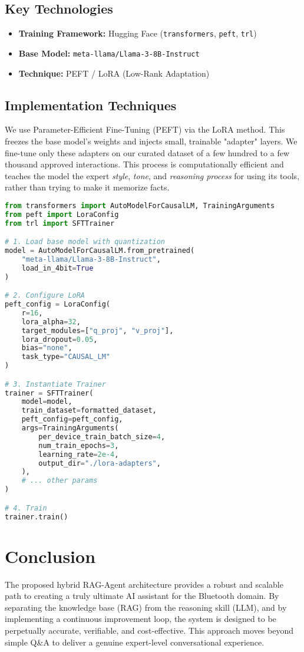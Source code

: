 \documentclass[11pt, a4paper]{article}
\begin{document}
\subsection{Key Technologies}
\begin{itemize}
    \item \textbf{Training Framework:} Hugging Face (\texttt{transformers}, \texttt{peft}, \texttt{trl})
    \item \textbf{Base Model:} \texttt{meta-llama/Llama-3-8B-Instruct}
    \item \textbf{Technique:} PEFT / LoRA (Low-Rank Adaptation)
\end{itemize}

\subsection{Implementation Techniques}
We use Parameter-Efficient Fine-Tuning (PEFT) via the LoRA method. This freezes the base model's weights and injects small, trainable "adapter" layers. We fine-tune only these adapters on our curated dataset of a few hundred to a few thousand approved interactions. This process is computationally efficient and teaches the model the expert \textit{style}, \textit{tone}, and \textit{reasoning process} for using its tools, rather than trying to make it memorize facts.

\begin{lstlisting}[language=Python, caption=Conceptual Fine-Tuning Script]
from transformers import AutoModelForCausalLM, TrainingArguments
from peft import LoraConfig
from trl import SFTTrainer

# 1. Load base model with quantization
model = AutoModelForCausalLM.from_pretrained(
    "meta-llama/Llama-3-8B-Instruct",
    load_in_4bit=True
)

# 2. Configure LoRA
peft_config = LoraConfig(
    r=16,
    lora_alpha=32,
    target_modules=["q_proj", "v_proj"],
    lora_dropout=0.05,
    bias="none",
    task_type="CAUSAL_LM"
)

# 3. Instantiate Trainer
trainer = SFTTrainer(
    model=model,
    train_dataset=formatted_dataset,
    peft_config=peft_config,
    args=TrainingArguments(
        per_device_train_batch_size=4,
        num_train_epochs=3,
        learning_rate=2e-4,
        output_dir="./lora-adapters",
    ),
    # ... other params
)

# 4. Train
trainer.train()
\end{lstlisting}

\section{Conclusion}
The proposed hybrid RAG-Agent architecture provides a robust and scalable path to creating a truly ultimate AI assistant for the Bluetooth domain. By separating the knowledge base (RAG) from the reasoning skill (LLM), and by implementing a continuous improvement loop, the system is designed to be perpetually accurate, verifiable, and cost-effective. This approach moves beyond simple Q\&A to deliver a genuine expert-level conversational experience.
\end{document}

